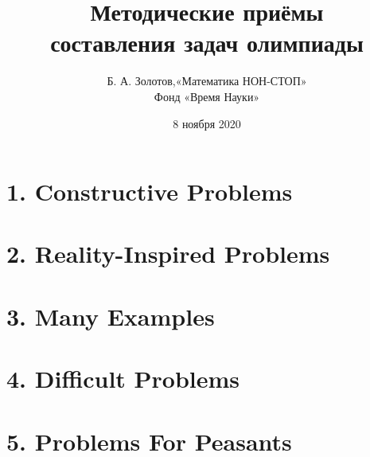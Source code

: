 \documentclass[aspectratio=1610,12pt,notheorems]{beamer}
\title[Methodic keys to MNS]
    {\bfseries Методические приёмы \\
	составления задач олимпиады}
\author[\ ]
	{Б. А. Золотов,\quad «Математика НОН-СТОП»\\ \vspace{0.3cm}
		{\small Фонд «Время Науки»}}
\institute[\ ]{\ }
\date{8 ноября 2020}
\begin{document}
\frame{\titlepage}



\section[Задачи на приведение примера]{1. Constructive Problems}

\section[Задачи, вдохновлённые реальностью]{2. Reality-Inspired Problems}

\section[Задачи на приведение множества примеров]{3. Many Examples}

\section[Самые сложные задачи]{4. Difficult Problems}

\section[Самые простые задачи]{5. Problems For Peasants}
\end{document}
